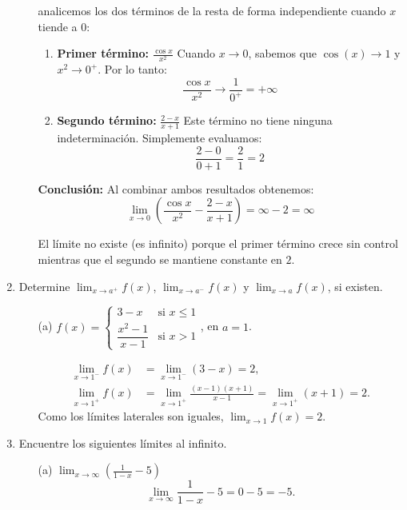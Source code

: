 \documentclass[12pt]{article}
\begin{document}
\begin{enumerate}[label=\arabic*.]
\begin{itemize}
        analicemos los dos términos de la resta de forma independiente cuando $x$ tiende a $0$:

\begin{enumerate}
    \item \textbf{Primer término:} $\displaystyle \frac{\cos x}{x^2}$
    Cuando $x \to 0$, sabemos que $\cos(x) \to 1$ y $x^2 \to 0^+$. Por lo tanto:
    \[ \frac{\cos x}{x^2} \to \frac{1}{0^+} = +\infty \]

    \item \textbf{Segundo término:} $\displaystyle \frac{2-x}{x+1}$
    Este término no tiene ninguna indeterminación. Simplemente evaluamos:
    \[ \frac{2-0}{0+1} = \frac{2}{1} = 2 \]
\end{enumerate}

\textbf{Conclusión:}
Al combinar ambos resultados obtenemos:
\[ \lim_{x\to0} \left( \frac{\cos x}{x^2} - \frac{2-x}{x+1} \right) = \infty - 2 = \infty \]

El límite no existe (es infinito) porque el primer término crece sin control mientras que el segundo se mantiene constante en $2$.
    \end{itemize}

    \item Determine $\lim_{x\to a^+}f(x)$, $\lim_{x\to a^-}f(x)$ y $\lim_{x\to a}f(x)$, si existen.
    \begin{itemize}
        \item[(a)] $f(x) = \begin{cases}
            3-x & \text{si } x \le 1 \\
            \dfrac{x^2-1}{x-1} & \text{si } x > 1
        \end{cases}$, en $a=1$.
        
        \begin{align*}
            \lim_{x\to1^-} f(x) &= \lim_{x\to1^-} (3-x) = 2, \\
            \lim_{x\to1^+} f(x) &= \lim_{x\to1^+} \frac{(x-1)(x+1)}{x-1} = \lim_{x\to1^+} (x+1) = 2.
        \end{align*}
        Como los límites laterales son iguales, $\lim_{x\to1} f(x) = 2$.
    \end{itemize}

    \item Encuentre los siguientes límites al infinito.
    \begin{itemize}
        \item[(a)] $\displaystyle \lim_{x\to\infty}\left(\frac{1}{1-x}-5\right)$
        \[
        \lim_{x\to\infty} \frac{1}{1-x} - 5 = 0 - 5 = -5.
        \]
        

\end{itemize}
\end{enumerate}
\end{document}
